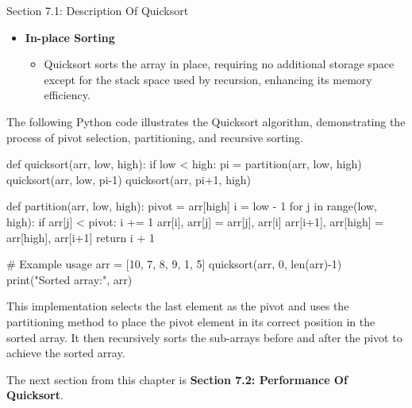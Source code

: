 \begin{notes}{Section 7.1: Description Of Quicksort}
\begin{itemize}
        \item \textbf{In-place Sorting}
        \begin{itemize}
            \item Quicksort sorts the array in place, requiring no additional storage space except for the stack space used by recursion, enhancing its memory efficiency.
        \end{itemize}
    \end{itemize}
    
    \begin{highlight}
        The following Python code illustrates the Quicksort algorithm, demonstrating the process of pivot selection, partitioning, and recursive sorting.
    \begin{code}[Python]
    def quicksort(arr, low, high):
        if low < high:
            pi = partition(arr, low, high)
            quicksort(arr, low, pi-1)
            quicksort(arr, pi+1, high)
    
    def partition(arr, low, high):
        pivot = arr[high]
        i = low - 1
        for j in range(low, high):
            if arr[j] < pivot:
                i += 1
                arr[i], arr[j] = arr[j], arr[i]
        arr[i+1], arr[high] = arr[high], arr[i+1]
        return i + 1
    
    # Example usage
    arr = [10, 7, 8, 9, 1, 5]
    quicksort(arr, 0, len(arr)-1)
    print("Sorted array:", arr)
    \end{code}
        
        This implementation selects the last element as the pivot and uses the partitioning method to place the pivot element in its correct position in the sorted array. It then recursively sorts the 
        sub-arrays before and after the pivot to achieve the sorted array.
    \end{highlight}    
\end{notes}

The next section from this chapter is \textbf{Section 7.2: Performance Of Quicksort}.

